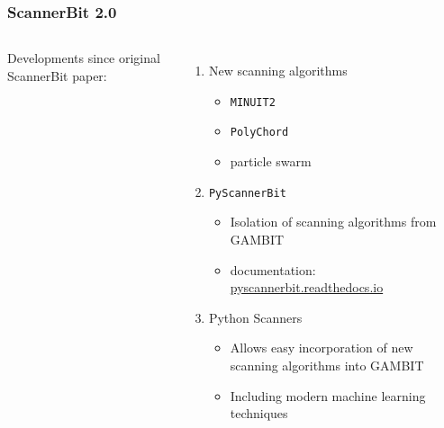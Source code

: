 \documentclass[aspectratio=169]{beamer}
\begin{document}
\begin{frame}
    \frametitle{ScannerBit 2.0}
    \begin{columns}
        Developments since original ScannerBit paper:
        \begin{enumerate}
            \item New scanning algorithms
                \begin{itemize}
                    \item \texttt{MINUIT2}
                    \item \texttt{PolyChord}
                    \item particle swarm
                \end{itemize}
            \item \texttt{PyScannerBit}
                \begin{itemize}
                    \item Isolation of scanning algorithms from GAMBIT
                    \item documentation: \href{https://pyscannerbit.readthedocs.io}{pyscannerbit.readthedocs.io}
                \end{itemize}
            \item Python Scanners
                \begin{itemize}
                    \item Allows easy incorporation of new scanning algorithms into GAMBIT
                    \item Including modern machine learning techniques
                \end{itemize}
        \end{enumerate}
        
    \end{columns}
\end{frame}
\end{document}
